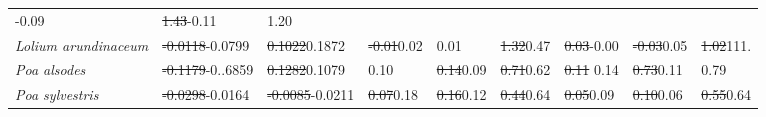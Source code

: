 \documentclass[lineno, sn-basic]{sn-jnl}%
\providecommand{\DIFadd}[1]{{\protect\color{blue}#1}} %
\providecommand{\DIFdel}[1]{{\protect\color{red}\protect\scriptsize\sout{#1}}}
\providecommand{\DIFadd}[1]{{\protect\color{blue}\uwave{#1}}} %
\providecommand{\DIFdel}[1]{{\protect\color{red}\sout{#1}}}                      %
\providecommand{\DIFaddbegin}{} %
\providecommand{\DIFaddend}{} %
\providecommand{\DIFdelbegin}{} %
\providecommand{\DIFdelend}{} %
\newcommand{\DIFscaledelfig}{0.5}
\newlength{\DIFdelgraphicswidth} %
\newlength{\DIFdelgraphicsheight} %
\newcommand{\DIFaddincludegraphics}[2][]{{\color{blue}\fbox{\DIFOincludegraphics[#1]{#2}}}} %
\newcommand{\DIFdelincludegraphics}[2][]{%
\sbox{\DIFdelgraphicsbox}{\DIFOincludegraphics[#1]{#2}}%
\settoboxwidth{\DIFdelgraphicswidth}{\DIFdelgraphicsbox} %
\settoboxtotalheight{\DIFdelgraphicsheight}{\DIFdelgraphicsbox} %
\scalebox{\DIFscaledelfig}{%
\parbox[b]{\DIFdelgraphicswidth}{\usebox{\DIFdelgraphicsbox}\\[-\baselineskip] \rule{\DIFdelgraphicswidth}{0em}}\llap{\resizebox{\DIFdelgraphicswidth}{\DIFdelgraphicsheight}{%
\setlength{\unitlength}{\DIFdelgraphicswidth}%
\begin{picture}(1,1)%
\thicklines\linethickness{2pt} %
{\color[rgb]{1,0,0}\put(0,0){\framebox(1,1){}}}%
{\color[rgb]{1,0,0}\put(0,0){\line( 1,1){1}}}%
{\color[rgb]{1,0,0}\put(0,1){\line(1,-1){1}}}%
\end{picture}%
}\hspace*{3pt}}} %
} %
\DeclareRobustCommand{\DIFaddbegin}{\DIFOaddbegin \let\includegraphics\DIFaddincludegraphics} %
\DeclareRobustCommand{\DIFaddend}{\DIFOaddend \let\includegraphics\DIFOincludegraphics} %
\DeclareRobustCommand{\DIFdelbegin}{\DIFOdelbegin \let\includegraphics\DIFdelincludegraphics} %
\DeclareRobustCommand{\DIFdelend}{\DIFOaddend \let\includegraphics\DIFOincludegraphics} %
\begin{document}
\begin{table}
\begin{tabular}{lp{1.4cm}p{1.4cm}p{1.5cm}p{1.5cm}p{1.5cm}p{1.5cm}p{1.5cm}p{1.5cm}}
\DIFdelend -0.09&\DIFdelbegin \DIFdel{1.43}\DIFdelend \DIFaddbegin \DIFadd{-0.11}&\DIFadd{1.20}\DIFaddend \\
		\emph{Lolium arundinaceum} &\DIFdelbegin \DIFdel{-0.0118}\DIFdelend \DIFaddbegin \DIFadd{-0.0799}\DIFaddend &\DIFdelbegin \DIFdel{0.1022}\DIFdelend \DIFaddbegin \DIFadd{0.1872}\DIFaddend &\DIFdelbegin \DIFdel{-0.01}\DIFdelend \DIFaddbegin \DIFadd{0.02}\DIFaddend &0.01&\DIFdelbegin \DIFdel{1.32}\DIFdelend \DIFaddbegin \DIFadd{0.47}\DIFaddend &\DIFdelbegin \DIFdel{0.03}\DIFdelend \DIFaddbegin \DIFadd{-0.00}\DIFaddend &\DIFdelbegin \DIFdel{-0.03}\DIFdelend \DIFaddbegin \DIFadd{0.05}\DIFaddend &\DIFdelbegin \DIFdel{1.02}\DIFdelend \DIFaddbegin \DIFadd{111.}\DIFaddend \\
		\emph{Poa alsodes} &\DIFdelbegin \DIFdel{-0.1179}\DIFdelend \DIFaddbegin \DIFadd{-0..6859}\DIFaddend &\DIFdelbegin \DIFdel{0.1282}\DIFdelend \DIFaddbegin \DIFadd{0.1079}\DIFaddend &0.10&\DIFdelbegin \DIFdel{0.14}\DIFdelend \DIFaddbegin \DIFadd{0.09}\DIFaddend &\DIFdelbegin \DIFdel{0.71}\DIFdelend \DIFaddbegin \DIFadd{0.62}\DIFaddend &\DIFdelbegin \DIFdel{0.11}%
\DIFdelend 0.14&\DIFdelbegin \DIFdel{0.73}\DIFdelend \DIFaddbegin \DIFadd{0.11}&\DIFadd{0.79}\DIFaddend \\
		\emph{Poa sylvestris}&\DIFdelbegin \DIFdel{-0.0298}\DIFdelend \DIFaddbegin \DIFadd{-0.0164}\DIFaddend &\DIFdelbegin \DIFdel{-0.0085}\DIFdelend \DIFaddbegin \DIFadd{-0.0211}\DIFaddend &\DIFdelbegin \DIFdel{0.07}\DIFdelend \DIFaddbegin \DIFadd{0.18}\DIFaddend &\DIFdelbegin \DIFdel{0.16}\DIFdelend \DIFaddbegin \DIFadd{0.12}\DIFaddend &\DIFdelbegin \DIFdel{0.44}\DIFdelend \DIFaddbegin \DIFadd{0.64}\DIFaddend &\DIFdelbegin \DIFdel{0.05}\DIFdelend \DIFaddbegin \DIFadd{0.09}\DIFaddend &\DIFdelbegin \DIFdel{0.10}\DIFdelend \DIFaddbegin \DIFadd{0.06}\DIFaddend &\DIFdelbegin \DIFdel{0.55}\DIFdelend \DIFaddbegin \DIFadd{0.64}\DIFaddend \\
		\bottomrule
	\end{tabular}
\end{table}



\DIFdelbegin %

\end{document}
